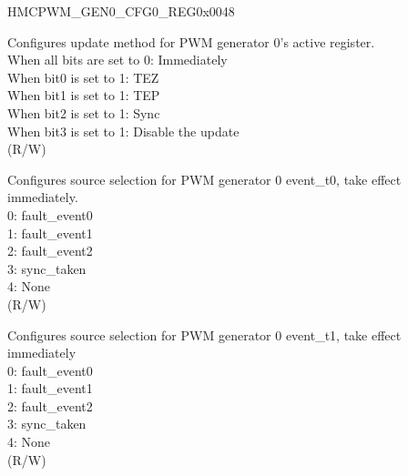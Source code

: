 \begin{register}{H}{MCPWM\_GEN0\_CFG0\_REG}{0x0048}\label{regdesc:MCPWMGEN0CFG0REG}
%
%
%
%
\regnewline%
\begin{regdesc}\begin{reglist}
\label{fielddesc:MCPWMGEN0CFGUPMETHOD}\item [MCPWM\_GEN0\_CFG\_UPMETHOD] Configures update method for PWM generator 0's active register.
\\When all bits are set to 0: Immediately
\\When bit0 is set to 1: TEZ
\\When bit1 is set to 1: TEP 
\\When bit2 is set to 1: Sync 
\\When bit3 is set to 1: Disable the update 
\\(R/W)
\label{fielddesc:MCPWMGEN0T0SEL}\item [MCPWM\_GEN0\_T0\_SEL] Configures source selection for PWM generator 0 event\_t0, take effect immediately. 
\\0: fault\_event0 
\\1: fault\_event1 
\\2: fault\_event2 
\\3: sync\_taken
\\4: None 
\\(R/W)
\label{fielddesc:MCPWMGEN0T1SEL}\item [MCPWM\_GEN0\_T1\_SEL] Configures source selection for PWM generator 0 event\_t1, take effect immediately 
\\0: fault\_event0
\\1: fault\_event1 
\\2: fault\_event2 
\\3: sync\_taken
\\4: None 
\\(R/W)
\end{reglist}\end{regdesc}
\end{register}


